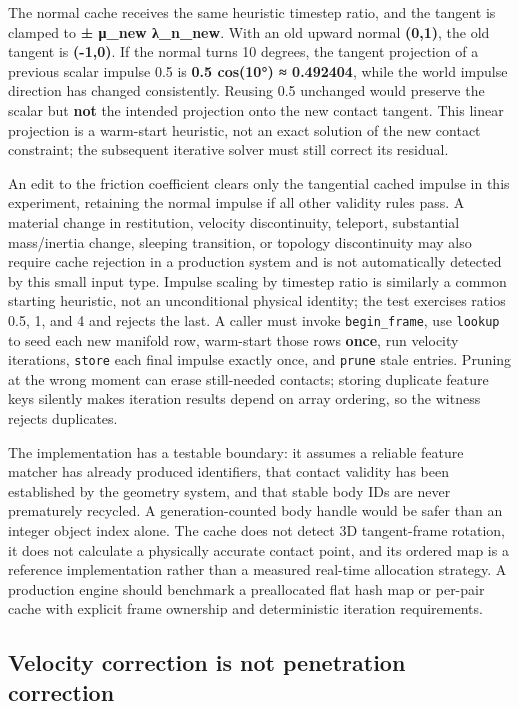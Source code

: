 The normal cache receives the same heuristic timestep ratio, and the tangent is clamped to \textbf{± μ\_new λ\_n\_new}. With an old upward normal \textbf{(0,1)}, the old tangent is \textbf{(-1,0)}. If the normal turns 10 degrees, the tangent projection of a previous scalar impulse 0.5 is \textbf{0.5 cos(10°) ≈ 0.492404}, while the world impulse direction has changed consistently. Reusing 0.5 unchanged would preserve the scalar but \textbf{not} the intended projection onto the new contact tangent. This linear projection is a warm-start heuristic, not an exact solution of the new contact constraint; the subsequent iterative solver must still correct its residual.

An edit to the friction coefficient clears only the tangential cached impulse in this experiment, retaining the normal impulse if all other validity rules pass. A material change in restitution, velocity discontinuity, teleport, substantial mass/inertia change, sleeping transition, or topology discontinuity may also require cache rejection in a production system and is not automatically detected by this small input type. Impulse scaling by timestep ratio is similarly a common starting heuristic, not an unconditional physical identity; the test exercises ratios 0.5, 1, and 4 and rejects the last. A caller must invoke \texttt{begin\_frame}, use \texttt{lookup} to seed each new manifold row, warm-start those rows \textbf{once}, run velocity iterations, \texttt{store} each final impulse exactly once, and \texttt{prune} stale entries. Pruning at the wrong moment can erase still-needed contacts; storing duplicate feature keys silently makes iteration results depend on array ordering, so the witness rejects duplicates.

The implementation has a testable boundary: it assumes a reliable feature matcher has already produced identifiers, that contact validity has been established by the geometry system, and that stable body IDs are never prematurely recycled. A generation-counted body handle would be safer than an integer object index alone. The cache does not detect 3D tangent-frame rotation, it does not calculate a physically accurate contact point, and its ordered map is a reference implementation rather than a measured real-time allocation strategy. A production engine should benchmark a preallocated flat hash map or per-pair cache with explicit frame ownership and deterministic iteration requirements.

\subsection{Velocity correction is not penetration correction}\label{appendix-c9d92e145503-velocity-correction-is-not-penetration-correction}

